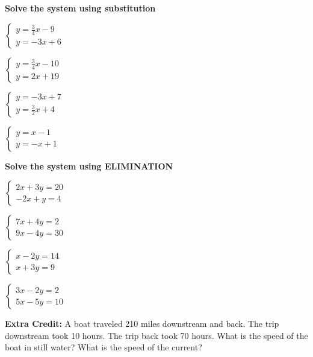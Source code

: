 \documentclass[11pt]{article}
\begin{document}
\pagebreak

\hrulefill

\textbf{Solve the system using substitution}\\ %

\begin{multicols}{2}

$\begin{cases}
	y=\frac{3}{4}x-9\\
	y=-3x+6
\end{cases}$

\vspace{1in}

$\begin{cases}
	y=\frac{3}{4}x-10\\
	y=2x+19
\end{cases}$

\vspace{1in}

$\begin{cases}
	y=-3x+7\\
	y=\frac{3}{2}x+4
\end{cases}$

\vspace{1in}

$\begin{cases}
	y=x-1\\
	y=-x+1
\end{cases}$

\vspace{1in}

\end{multicols}

\hrulefill

\textbf{Solve the system using ELIMINATION}\\

\begin{multicols}{2}

$\begin{cases}
	2x+3y=20\\
	-2x+y=4
\end{cases}$

\vspace{1in}

$\begin{cases}
	7x+4y=2\\
	9x-4y=30
\end{cases}$

\vspace{1in}

$\begin{cases}
	x-2y=14\\
	x+3y=9
\end{cases}$

\vspace{1in}

$\begin{cases}
	3x-2y=2\\
	5x-5y=10
\end{cases}$

\vspace{1in}

\end{multicols}

\hrulefill

\textbf{Extra Credit:} A boat traveled 210 miles downstream and back. The trip downstream took 10 hours. The trip back
took 70 hours. What is the speed of the boat in still water? What is the speed of the current?
\end{document}
